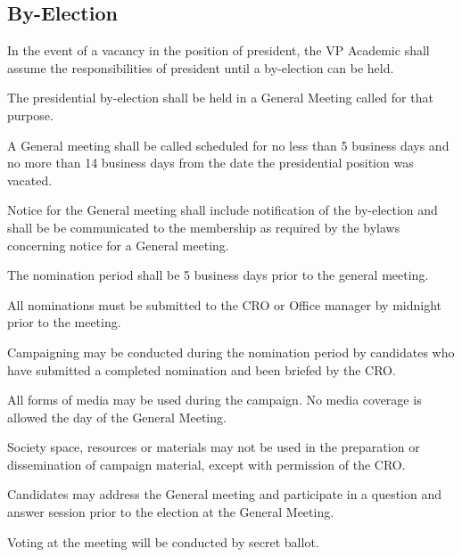 \subsection {By-Election}
\begin{longenum}[ label*=\thesubsection.\arabic*., align=left]
	\item In the event of a vacancy in the position of president, the VP Academic shall assume the responsibilities of president until a by-election can be held.
	\item The presidential by-election shall be held in a General Meeting called for that purpose.
	\item A General meeting shall be called scheduled for no less than 5 business days and no more than 14 business days from the date the presidential position was vacated. 
	\item Notice for the General meeting shall include notification of the by-election and shall be be communicated to the membership as required by the bylaws concerning notice for a General meeting.
	\item The nomination period shall be 5 business days prior to the general meeting.
	\item All nominations must be submitted to the CRO or Office manager by midnight prior to the meeting.
	\item Campaigning may be conducted during the nomination period by candidates who have submitted a completed nomination and been briefed by the CRO.
	\item All forms of media may be used during the campaign. No media coverage is allowed the day of the General Meeting.  
	\item Society space, resources or materials may not be used in the preparation or dissemination of campaign material, except with permission of the CRO.
	\item Candidates may address the General meeting and participate in a question and answer session prior to the election at the General Meeting.
	\item Voting at the meeting will be conducted by secret ballot.

\end{longenum}
